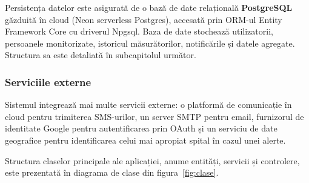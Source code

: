 \documentclass[12pt,a4paper,twoside]{article}
\begin{document}
Persistența datelor este asigurată de o bază de date relațională \textbf{PostgreSQL} găzduită în cloud (Neon serverless Postgres), accesată prin ORM-ul Entity Framework Core cu driverul Npgsql. Baza de date stochează utilizatorii, persoanele monitorizate, istoricul măsurătorilor, notificările și datele agregate. Structura sa este detaliată în subcapitolul următor.

\subsubsection{Serviciile externe}

Sistemul integrează mai multe servicii externe: o platformă de comunicație în cloud pentru trimiterea SMS-urilor, un server SMTP pentru email, furnizorul de identitate Google pentru autentificarea prin OAuth și un serviciu de date geografice pentru identificarea celui mai apropiat spital în cazul unei alerte.

Structura claselor principale ale aplicației, anume entități, servicii și controlere, este prezentată în diagrama de clase din figura~\ref{fig:clase}.
\end{document}
